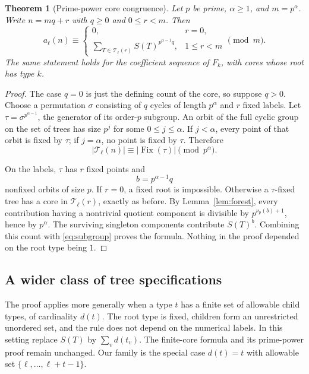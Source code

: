 \documentclass[11pt,letterpaper]{article}
\newtheorem{theorem}{Theorem}[section]
\theoremstyle{definition}
\theoremstyle{remark}
\newcommand{\T}{\mathcal T}
\newcommand{\Fix}{\operatorname{Fix}}
\begin{document}
\begin{theorem}[Prime-power core congruence]\label{thm:primepower}
Let $p$ be prime, $\alpha\ge1$, and $m=p^\alpha$. Write
$n=mq+r$ with $q\ge0$ and $0\le r<m$. Then
\begin{equation}\label{eq:powercore}
 a_\ell(n)\equiv
 \begin{cases}
 0,&r=0,\\
 \displaystyle\sum_{T\in\T_\ell(r)}
 S(T)^{p^{\alpha-1}q},&1\le r<m
 \end{cases}\pmod m.
\end{equation}
The same statement holds for the coefficient sequence of $F_k$,
with cores whose root has type $k$.
\end{theorem}
\begin{proof}
The case $q=0$ is just the defining count of the core, so suppose $q>0$.
Choose a permutation $\sigma$ consisting of $q$ cycles of length
$p^\alpha$ and $r$ fixed labels. Let
$\tau=\sigma^{p^{\alpha-1}}$, the generator of its order-$p$ subgroup.
An orbit of the full cyclic group on the set of trees has size $p^j$
for some $0\le j\le\alpha$. If $j<\alpha$, every point of that orbit is
fixed by $\tau$; if $j=\alpha$, no point is fixed by $\tau$.
Therefore
\begin{equation}\label{eq:subgroup}
 |\T_\ell(n)|\equiv|\Fix(\tau)|\pmod{p^\alpha}.
\end{equation}

On the labels, $\tau$ has $r$ fixed points and
\[
 b=p^{\alpha-1}q
\]
nonfixed orbits of size $p$. If $r=0$, a fixed root is impossible.
Otherwise a $\tau$-fixed tree has a core in $\T_\ell(r)$, exactly as
before. By Lemma~\ref{lem:forest}, every contribution having a
nontrivial quotient component is divisible by
$p^{\nu_p(b)+1}$, hence by $p^\alpha$.
The surviving singleton components contribute $S(T)^b$.
Combining this count with \eqref{eq:subgroup} proves the formula.
Nothing in the proof depended on the root type being $1$.
\end{proof}

\subsection{A wider class of tree specifications}
The proof applies more generally when a type $t$ has a finite set of
allowable child types, of cardinality $d(t)$. The root type is fixed,
children form an unrestricted unordered set, and the rule does not
depend on the numerical labels. In this setting replace $S(T)$ by
$\sum_v d(t_v)$. The finite-core formula and its prime-power proof remain
unchanged. Our family is the special case $d(t)=t$ with allowable set
$\{\ell,\ldots,\ell+t-1\}$.
\end{document}
